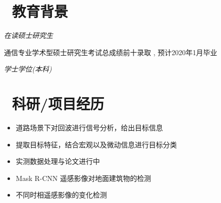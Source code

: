 \documentclass{resume}
\begin{document}


\medskip\noindent



\section{\faGraduationCap\  教育背景}
\textit{在读硕士研究生}
\item{\quad \quad \quad \quad \quad \quad \quad \quad 通信专业学术型硕士研究生考试总成绩前十录取 , 预计2020年1月毕业}


\textit{学士学位(本科)}

\section{\faUsers\ 科研/项目经历}

\begin{itemize}[topsep = 0 pt, partopsep = 0pt]
  \item 道路场景下对回波进行信号分析，给出目标信息
  \item 提取目标特征，结合宏观以及微动信息进行目标分类
  \item 实测数据处理与论文进行中
\end{itemize}


\begin{itemize}[topsep = 0 pt, partopsep = 0pt]
  \item Mask R-CNN 遥感影像对地面建筑物的检测
  \item 不同时相遥感影像的变化检测
\end{itemize}
\end{document}
